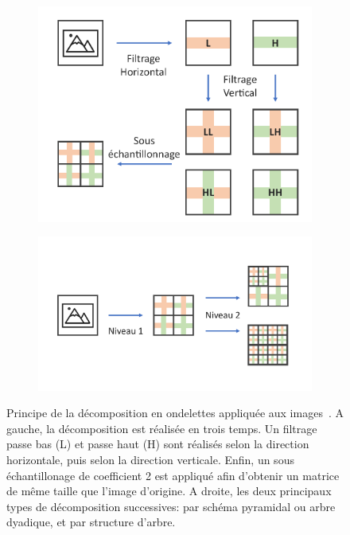 \begin{figure}[H]
\centering
    \begin{subfigure}{.45\textwidth}
      \centering
      \includegraphics[width=\textwidth]{contents/chapter_4/resources/scheme_dwt.pdf}
    \end{subfigure}
    \vrule
    \begin{subfigure}{.45\textwidth}
      \centering
      \includegraphics[width=\textwidth]{contents/chapter_4/resources/scheme_dwt_decomposition.pdf}
    \end{subfigure}
    \caption{Principe de la décomposition en ondelettes appliquée aux images~\cite{Livens1997}. A gauche, la décomposition est réalisée en trois temps. Un filtrage passe bas (L) et passe haut (H) sont réalisés selon la direction horizontale, puis selon la direction verticale. Enfin, un sous échantillonage de coefficient 2 est appliqué afin d'obtenir un matrice de même taille que l'image d'origine. A droite, les  deux principaux types de décomposition successives: par schéma pyramidal ou arbre dyadique, et par structure d'arbre.}
    \label{fig:scheme_dwt}
\end{figure}\par

